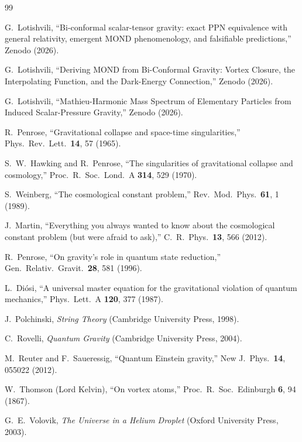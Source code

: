 \documentclass[aps,prd,onecolumn,superscriptaddress,nofootinbib,showpacs,12pt,notitlepage]{revtex4-2}
\begin{document}
\begin{thebibliography}{99}

  G.~Lotishvili,
  ``Bi-conformal scalar-tensor gravity: exact PPN equivalence with
  general relativity, emergent MOND phenomenology, and falsifiable
  predictions,''
  Zenodo (2026).

  G.~Lotishvili,
  ``Deriving MOND from Bi-Conformal Gravity: Vortex Closure,
  the Interpolating Function, and the Dark-Energy Connection,''
  Zenodo (2026).

  G.~Lotishvili,
  ``Mathieu-Harmonic Mass Spectrum of Elementary Particles
  from Induced Scalar-Pressure Gravity,''
  Zenodo (2026).

  R.~Penrose,
  ``Gravitational collapse and space-time singularities,''
  Phys.\ Rev.\ Lett.\ \textbf{14}, 57 (1965).

  S.~W.~Hawking and R.~Penrose,
  ``The singularities of gravitational collapse and cosmology,''
  Proc.\ R.\ Soc.\ Lond.\ A \textbf{314}, 529 (1970).

  S.~Weinberg,
  ``The cosmological constant problem,''
  Rev.\ Mod.\ Phys.\ \textbf{61}, 1 (1989).

  J.~Martin,
  ``Everything you always wanted to know about the cosmological
  constant problem (but were afraid to ask),''
  C.\ R.\ Phys.\ \textbf{13}, 566 (2012).

  R.~Penrose,
  ``On gravity's role in quantum state reduction,''
  Gen.\ Relativ.\ Gravit.\ \textbf{28}, 581 (1996).

  L.~Di\'osi,
  ``A universal master equation for the gravitational violation
  of quantum mechanics,''
  Phys.\ Lett.\ A \textbf{120}, 377 (1987).

  J.~Polchinski,
  \textit{String Theory} (Cambridge University Press, 1998).

  C.~Rovelli,
  \textit{Quantum Gravity} (Cambridge University Press, 2004).

  M.~Reuter and F.~Saueressig,
  ``Quantum Einstein gravity,''
  New J.\ Phys.\ \textbf{14}, 055022 (2012).

  W.~Thomson (Lord Kelvin),
  ``On vortex atoms,''
  Proc.\ R.\ Soc.\ Edinburgh \textbf{6}, 94 (1867).

  G.~E.~Volovik,
  \textit{The Universe in a Helium Droplet}
  (Oxford University Press, 2003).


\end{thebibliography}
\end{document}
